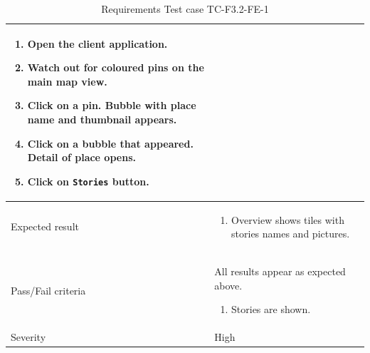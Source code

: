 \documentclass[11pt]{book}
\begin{document}
\begin{table}
\begin{tabular}{| p{3cm} | p{9.5cm} |}
                            \begin{enumerate}
                              \item Open the client application.
                              \item Watch out for coloured pins on the main map view.
                              \item Click on a pin. Bubble with place name and thumbnail appears.
                              \item Click on a bubble that appeared. Detail of place opens.
                              \item Click on \texttt{Stories} button.
                            \end{enumerate} \\ \hline 
    Expected result       & \begin{enumerate}
                              \item Overview shows tiles with stories names and pictures.
                            \end{enumerate} \\ \hline 
    Pass/Fail criteria    & All results appear as expected above.
                            \begin{enumerate}
                              \item Stories are shown.
                            \end{enumerate} \\ \hline 
    Severity              & High \\ \hline 
  \end{tabular}
  \caption{Requirements Test case TC-F3.2-FE-1}
  \label{tab:TCF3.2FE1}
\end{table}
\end{document}
